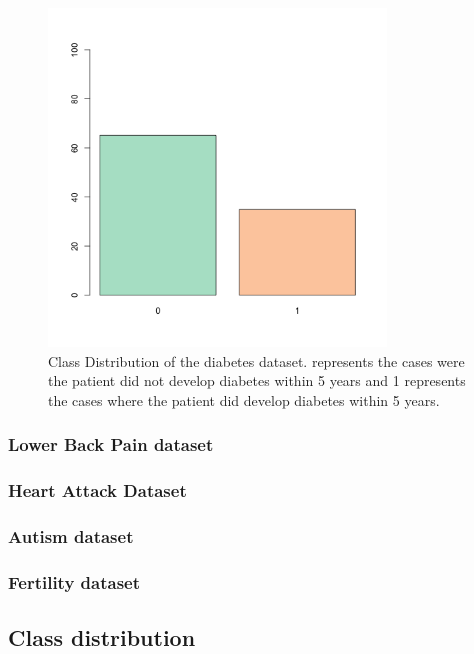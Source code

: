\begin{figure}[H]
    \centering
    \includegraphics[width=0.8\textwidth]{ThesisTemplate/usingLatex/chapter4Images/figure4_8.png}
    \caption{Class Distribution of the diabetes dataset. represents the cases were the patient did not develop diabetes within 5 years and 1 represents the cases where the patient did develop diabetes within 5 years.}
    \label{fig:my_label}
\end{figure}

\subsubsection{Lower Back Pain dataset}
\subsubsection{Heart Attack Dataset}
\subsubsection{Autism dataset}
\subsubsection{Fertility dataset}

\subsection{Class distribution}



